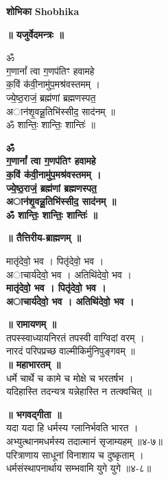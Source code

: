 \documentclass[12pt]{article}
\begin{document}
\begin{center}
  {\Large \textbf{शोभिका} \hfill \textbf{Shobhika}}

  \vspace{0.25in}

  \large
  \textbf{॥ यजुर्वेदमन्त्रः ॥}
  \begin{multicols}{2}
    ॐ \\
    ग॒णानां᳚ त्वा ग॒णप॑तिꣳ हवामहे \\
    क॒विं क॑वी॒नामु॑प॒मश्र॑वस्तमम् । \\
    ज्ये॒ष्ठ॒राजं॒ ब्रह्म॑णां ब्रह्मणस्पत॒ \\
    अान॑शृ॒वन्नू॒तिभि॑स्सीद॒ साद॑नम् ॥ \\
    ॐ शान्तिः॒ शान्तिः॒ शान्तिः॑ ॥

    \textbf{ॐ \\
      ग॒णानां᳚ त्वा ग॒णप॑तिꣳ हवामहे \\
      क॒विं क॑वी॒नामु॑प॒मश्र॑वस्तमम् । \\
      ज्ये॒ष्ठ॒राजं॒ ब्रह्म॑णां ब्रह्मणस्पत॒ \\
      अान॑शृ॒वन्नू॒तिभि॑स्सीद॒ साद॑नम् ॥ \\
      ॐ शान्तिः॒ शान्तिः॒ शान्तिः॑ ॥}
  \end{multicols}

  \normalsize
  \textbf{॥ तैत्तिरीय-ब्राह्मणम् ॥}
  \begin{multicols}{2}
    मातृ॑देवो॒ भव । पितृ॑देवो॒ भव । \\
    अाचार्य॑देवो॒ भव । अतिथि॑देवो॒ भव । \\
    \textbf{मातृ॑देवो॒ भव । पितृ॑देवो॒ भव । \\
      अाचार्य॑देवो॒ भव । अतिथि॑देवो॒ भव ।}
  \end{multicols}

  \begin{multicols}{2}
    \footnotesize
    \textbf{॥ रामायणम् ॥} \\
    तपस्स्वाध्यायनिरतं तपस्वी वाग्विदां वरम् । \\
    नारदं परिपप्रच्छ वाल्मीकिर्मुनिपुङ्गवम् ॥ \\
    \textbf{॥ महाभारतम् ॥} \\
    धर्मे चार्थे च कामे च मोक्षे च भरतर्षभ । \\
    यदिहास्ति तदन्यत्र यन्नेहास्ति न तत्क्वचित् ॥
  \end{multicols}
  
  \Large
  \textbf{॥ भगवद्गीता ॥} \\
  यदा यदा हि धर्मस्य ग्लानिर्भवति भारत । \\
  अभ्युत्थानमधर्मस्य तदात्मानं सृजाम्यहम् ॥४-७॥ \\
  परित्राणाय साधूनां विनाशाय च दुष्कृताम् । \\
  धर्मसंस्थापनार्थाय सम्भवामि युगे युगे ॥४-८॥
\end{center}
\end{document}

